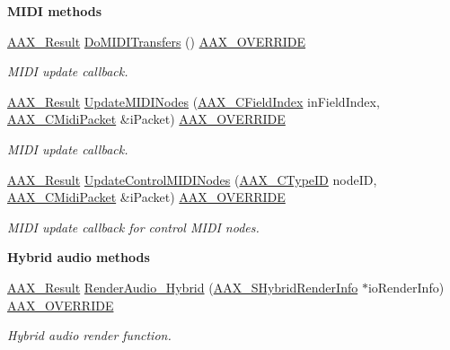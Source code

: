 \begin{Indent}\textbf{ M\+I\+DI methods}\par
\begin{DoxyCompactItemize}
\item 
\mbox{\hyperlink{a00392_a4d8f69a697df7f70c3a8e9b8ee130d2f}{A\+A\+X\+\_\+\+Result}} \mbox{\hyperlink{a01481_ae1076f7e181a6f66f0078bf31beb2cf1}{Do\+M\+I\+D\+I\+Transfers}} () \mbox{\hyperlink{a00392_ac2f24a5172689ae684344abdcce55463}{A\+A\+X\+\_\+\+O\+V\+E\+R\+R\+I\+DE}}
\begin{DoxyCompactList}\small\item\em M\+I\+DI update callback. \end{DoxyCompactList}\item 
\mbox{\hyperlink{a00392_a4d8f69a697df7f70c3a8e9b8ee130d2f}{A\+A\+X\+\_\+\+Result}} \mbox{\hyperlink{a01481_aac6fa72278c0f46aa430cd79bdb2d767}{Update\+M\+I\+D\+I\+Nodes}} (\mbox{\hyperlink{a00392_ae807f8986143820cfb5d6da32165c9c7}{A\+A\+X\+\_\+\+C\+Field\+Index}} in\+Field\+Index, \mbox{\hyperlink{a01429}{A\+A\+X\+\_\+\+C\+Midi\+Packet}} \&i\+Packet) \mbox{\hyperlink{a00392_ac2f24a5172689ae684344abdcce55463}{A\+A\+X\+\_\+\+O\+V\+E\+R\+R\+I\+DE}}
\begin{DoxyCompactList}\small\item\em M\+I\+DI update callback. \end{DoxyCompactList}\item 
\mbox{\hyperlink{a00392_a4d8f69a697df7f70c3a8e9b8ee130d2f}{A\+A\+X\+\_\+\+Result}} \mbox{\hyperlink{a01481_ac6720637afc7a87adfd391c4ef59126f}{Update\+Control\+M\+I\+D\+I\+Nodes}} (\mbox{\hyperlink{a00392_ac678f9c1fbcc26315d209f71a147a175}{A\+A\+X\+\_\+\+C\+Type\+ID}} node\+ID, \mbox{\hyperlink{a01429}{A\+A\+X\+\_\+\+C\+Midi\+Packet}} \&i\+Packet) \mbox{\hyperlink{a00392_ac2f24a5172689ae684344abdcce55463}{A\+A\+X\+\_\+\+O\+V\+E\+R\+R\+I\+DE}}
\begin{DoxyCompactList}\small\item\em M\+I\+DI update callback for control M\+I\+DI nodes. \end{DoxyCompactList}\end{DoxyCompactItemize}
\end{Indent}
\begin{Indent}\textbf{ Hybrid audio methods}\par
\begin{DoxyCompactItemize}
\item 
\mbox{\hyperlink{a00392_a4d8f69a697df7f70c3a8e9b8ee130d2f}{A\+A\+X\+\_\+\+Result}} \mbox{\hyperlink{a01481_a2b68c51ddd302b43c0df250fdd3ba239}{Render\+Audio\+\_\+\+Hybrid}} (\mbox{\hyperlink{a01673}{A\+A\+X\+\_\+\+S\+Hybrid\+Render\+Info}} $\ast$io\+Render\+Info) \mbox{\hyperlink{a00392_ac2f24a5172689ae684344abdcce55463}{A\+A\+X\+\_\+\+O\+V\+E\+R\+R\+I\+DE}}
\begin{DoxyCompactList}\small\item\em Hybrid audio render function. \end{DoxyCompactList}\end{DoxyCompactItemize}
\end{Indent}
